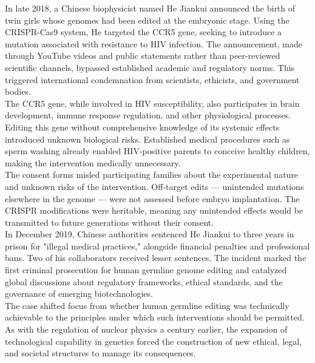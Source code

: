 \vfill
\begin{shadedstory}

In late 2018, a Chinese biophysicist named He Jiankui announced the birth of twin girls whose genomes had been edited at the embryonic stage. Using the CRISPR-Cas9 system, He targeted the CCR5 gene, seeking to introduce a mutation associated with resistance to HIV infection. The announcement, made through YouTube videos and public statements rather than peer-reviewed scientific channels, bypassed established academic and regulatory norms. This triggered international condemnation from scientists, ethicists, and government bodies.\\

The CCR5 gene, while involved in HIV susceptibility, also participates in brain development, immune response regulation, and other physiological processes. Editing this gene without comprehensive knowledge of its systemic effects introduced unknown biological risks. Established medical procedures such as sperm washing already enabled HIV-positive parents to conceive healthy children, making the intervention medically unnecessary.\\

 The consent forms misled participating families about the experimental nature and unknown risks of the intervention. Off-target edits — unintended mutations elsewhere in the genome — were not assessed before embryo implantation. The CRISPR modifications were heritable, meaning any unintended effects would be transmitted to future generations without their consent.\\

In December 2019, Chinese authorities sentenced He Jiankui to three years in prison for "illegal medical practices," alongside financial penalties and professional bans. Two of his collaborators received lesser sentences. The incident marked the first criminal prosecution for human germline genome editing and catalyzed global discussions about regulatory frameworks, ethical standards, and the governance of emerging biotechnologies.\\

The case shifted focus from whether human germline editing was technically achievable to the principles under which such interventions should be permitted. As with the regulation of nuclear physics a century earlier, the expansion of technological capability in genetics forced the construction of new ethical, legal, and societal structures to manage its consequences.

\end{shadedstory}
\vfill
